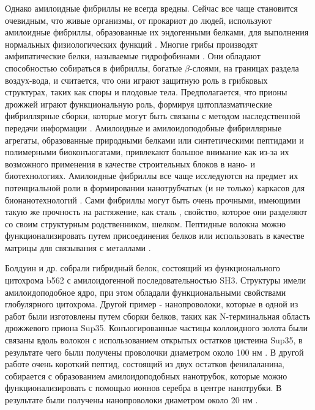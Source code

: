     Однако амилоидные фибриллы не всегда вредны. Сейчас все чаще становится очевидным, что живые организмы, от прокариот до людей, используют амилоидные фибриллы, образованные их эндогенными белками, для выполнения нормальных физиологических функций \cite{chiti_protein_2006,fowler_functional_2006}. Многие грибы производят амфипатические белки, называемые гидрофобинами \cite{sunde_structural_2008}. Они обладают способностью собираться в фибриллы, богатые $\beta$-слоями, на границах раздела воздух-вода, и считается, что они играют защитную роль в грибковых структурах, таких как споры и плодовые тела. Предполагается, что прионы дрожжей играют функциональную роль, формируя цитоплазматические фибриллярные сборки, которые могут быть связаны с методом наследственной передачи информации \cite{uptain_prions_2002}. Амилоидные и амилоидоподобные фибриллярные агрегаты, образованные природными белками или синтетическими пептидами и полимерными биоконъюгатами, привлекают большое внимание как из-за их возможного применения в качестве строительных блоков в нано- и биотехнологиях. Амилоидные фибриллы все чаще исследуются на предмет их потенциальной роли в формировании нанотрубчатых (и не только) каркасов для бионанотехнологий \cite{scheibel_conducting_2003,hamada_engineering_2004,hamedi_electrochemical_2008}. Сами фибриллы могут быть очень прочными, имеющими такую же прочность на растяжение, как сталь \cite{smith_characterization_2006}, свойство, которое они разделяют со своим структурным родственником, шелком. Пептидные волокна можно функционализировать путем присоединения белков \cite{baldwin_cytochrome_2006} или использовать в качестве матрицы для связывания с металлами \cite{scheibel_conducting_2003,reches_casting_2003}.
    
    Болдуин и др. \cite{baldwin_cytochrome_2006} собрали гибридный белок, состоящий из функционального цитохрома b562 с амилоидогенной последовательностью SH3. Структуры имели амилоидоподобное ядро, при этом обладали функциональными свойствами глобулярного цитохрома. Другой пример - нанопроволоки, которые в одной из работ были изготовлены путем сборки белков, таких как N-терминальная область дрожжевого приона Sup35. Конъюгированные частицы коллоидного золота были связаны вдоль волокон с использованием открытых остатков цистеина  Sup35, в результате чего были получены проволочки диаметром около 100 нм \cite{scheibel_conducting_2003}. В другой работе очень короткий пептид, состоящий из двух остатков фенилаланина, собирается с образованием амилоидоподобных нанотрубок, которые можно функционализировать с помощью ионнов серебра в центре нанотрубки. В результате были получены нанопроволоки диаметром около 20 нм \cite{reches_casting_2003}.
    
